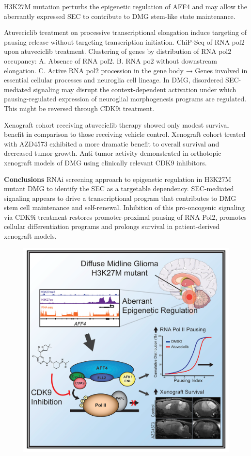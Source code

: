 H3K27M mutation perturbs the epigenetic regulation of AFF4 and may allow the aberrantly expressed SEC to contribute to DMG stem-like state maintenance.

Atuveciclib treatment on processive transcriptional
elongation induce targeting of pausing release
without targeting transcription initiation. ChiP-Seq of RNA pol2 upon atuveciclib treatment.
Clustering of genes by distribution of RNA pol2
occupancy:
A. Absence of RNA pol2.
B. RNA po2 without downstream elongation.
C. Active RNA pol2 procession in the gene body
→ Genes involved in essential cellular
processes and neuroglia cell lineage.
In DMG, disordered SEC-mediated signaling may disrupt the context-dependent activation under which
pausing-regulated expression of neuroglial morphogenesis programs are regulated. This might be
reversed through CDK9i treatment.

Xenograft cohort receiving atuveciclib therapy
showed only modest survival benefit in
comparison to those receiving vehicle control.
Xenograft cohort treated with AZD4573
exhibited a more dramatic benefit to overall
survival and decreased tumor growth.
Anti-tumor activity demonstrated in orthotopic xenograft models of DMG using clinically relevant CDK9 inhibitors.

\textbf{Conclusions}
RNAi screening approach to epigenetic regulation in
H3K27M mutant DMG to identify the SEC as a
targetable dependency.
SEC-mediated signaling appears to drive a
transcriptional program that contributes to DMG stem
cell maintenance and self-renewal.
Inhibition of this pro-oncogenic signaling via CDK9i
treatment restores promoter-proximal pausing of RNA
Pol2, promotes cellular differentiation programs and
prolongs survival in patient-derived xenograft models.

\begin{figure}
\centering
\includegraphics[width=\textwidth]{../_resources/Screen_Shot_2022-12-20_at_12-43-26.png}
\caption{}
\end{figure}

